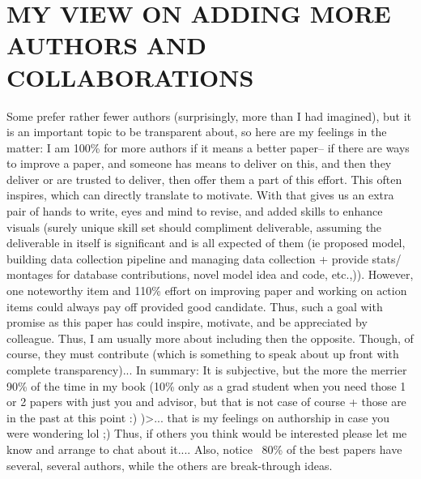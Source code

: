 \section*{MY VIEW ON ADDING MORE AUTHORS AND COLLABORATIONS}
Some prefer rather fewer authors (surprisingly, more than I had imagined), but it is an important topic to be transparent about, so here are my feelings in the matter: I am 100\% for more authors if it means a better paper-- if there are ways to improve a paper, and someone has means to deliver on this, and then they deliver or are trusted to deliver, then offer them a part of this effort. This often inspires, which can directly translate to motivate. With that gives us an extra pair of hands to write, eyes and mind to revise, and added skills to enhance visuals (surely unique skill set should compliment deliverable, assuming the deliverable in itself is significant and is all expected of them (ie proposed model, building data collection pipeline and managing data collection + provide stats/ montages for database contributions, novel model idea and code, etc.,)). However, one noteworthy item and 110\% effort on improving paper and working on action items could always pay off provided good candidate. Thus, such a goal with promise as this paper has could inspire, motivate, and be appreciated by colleague. Thus, I am usually more about including then the opposite. Though, of course, they must contribute (which is something to speak about up front with complete transparency)... In summary: It is subjective, but the more the merrier 90\% of the time in my book (10\% only as a grad student when you need those 1 or 2 papers with just you and advisor, but that is not case of course + those are in the past at this point :) )>... that is my feelings on authorship in case you were wondering lol ;) Thus, if others you think would be interested please let me know and arrange to chat about it.... Also, notice ~80\% of the best papers have several, several authors, while the others are break-through ideas.

\endgroup
\twocolumn